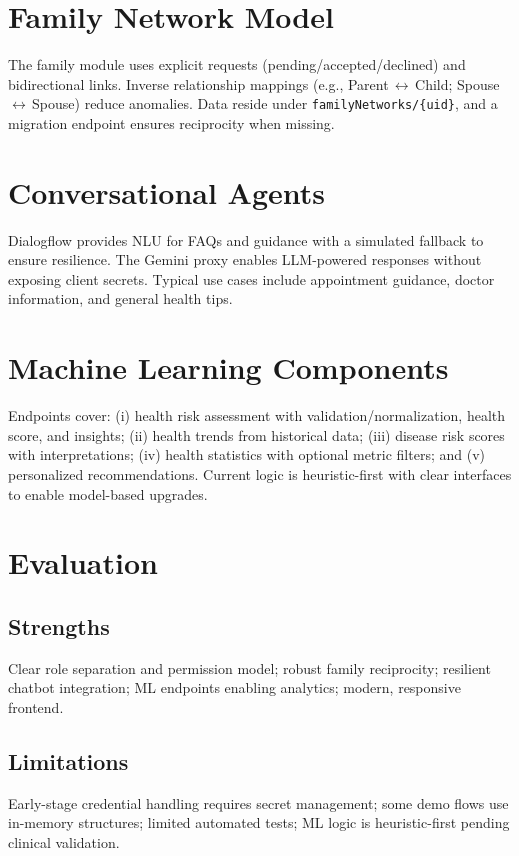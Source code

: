 \documentclass[conference]{IEEEtran}
\begin{document}
\section{Family Network Model}
The family module uses explicit requests (pending/accepted/declined) and bidirectional links. Inverse relationship mappings (e.g., Parent\,$\leftrightarrow$\,Child; Spouse\,$\leftrightarrow$\,Spouse) reduce anomalies. Data reside under \texttt{familyNetworks/\{uid\}}, and a migration endpoint ensures reciprocity when missing.

\section{Conversational Agents}
Dialogflow provides NLU for FAQs and guidance with a simulated fallback to ensure resilience. The Gemini proxy enables LLM-powered responses without exposing client secrets. Typical use cases include appointment guidance, doctor information, and general health tips.

\section{Machine Learning Components}
Endpoints cover: (i) health risk assessment with validation/normalization, health score, and insights; (ii) health trends from historical data; (iii) disease risk scores with interpretations; (iv) health statistics with optional metric filters; and (v) personalized recommendations. Current logic is heuristic-first with clear interfaces to enable model-based upgrades.

\section{Evaluation}
\subsection{Strengths}
Clear role separation and permission model; robust family reciprocity; resilient chatbot integration; ML endpoints enabling analytics; modern, responsive frontend.

\subsection{Limitations}
Early-stage credential handling requires secret management; some demo flows use in-memory structures; limited automated tests; ML logic is heuristic-first pending clinical validation.
\end{document}
